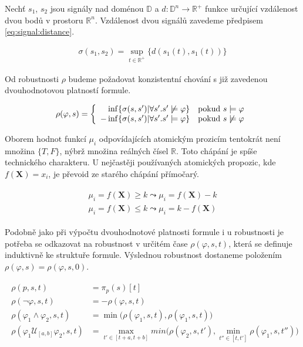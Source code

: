Nechť $s_1$, $s_2$ jsou signály nad doménou $\mathbb{D}$ a $d: \mathbb{D}^n \rightarrow \mathbb{R}^{+}$
funkce určující vzdálenost dvou bodů v prostoru $\mathbb{R}^n$. 
Vzdálenost dvou signálů zavedeme předpisem \ref{eq:signal:distance}.

\begin{align}\label{eq:signal:distance}
\sigma(s_1, s_2) = {\displaystyle \sup_{t \in \mathbb{R}^{+}}} \{d(s_1(t), s_1(t))\}
\end{align}

Od robustnosti $\rho$ budeme požadovat konzistentní chování s již zavedenou dvouhodnotovou platností
formule. 

\begin{align}\label{eq:signal:distance}
\rho(\varphi, s) = \left\{\begin{array}{r@{\quad}c}
\inf\{\sigma(s, s') | \forall s'. s' \not\models \varphi \}	& \textrm{pokud } s \models \varphi	\\
- \inf\{\sigma(s, s') | \forall s'. s' \models \varphi \}	& \textrm{pokud } s \not\models \varphi
\end{array} \right.
\end{align}

Oborem hodnot funkcí $\mu_i$ odpovídajících atomickým prozicím tentokrát není množina $\{T, F\}$,
nýbrž množina reálných čísel $\mathbb{R}$. Toto chápání je spíše technického charakteru. U nejčastěji používaných
atomických propozic, kde $f(\mathbf{X}) = x_i$, je převoid ze starého chápání přímočarý.

\begin{align}\label{eq:stl:semantics}
\begin{array}{ll}
\mu_i = f(\mathbf{X}) \geq k		\leadsto \mu_i = f(\mathbf{X}) - k							\\
\mu_i = f(\mathbf{X}) \leq k		\leadsto \mu_i = k - f(\mathbf{X})
\end{array}
\end{align}

Podobně jako při výpočtu dvouhodnotové platnosti formule i u robustnosti je potřeba se odkazovat
na robustnost v určitém čase $\rho(\varphi, s, t)$, která se definuje induktivně ke struktuře
formule. Výslednou robustnost dostaneme položením $\rho(\varphi, s) = \rho(\varphi, s, 0)$.

\begin{align}\label{eq:stl:semantics}
\begin{array}{ll}
\rho(p, s, t)											&= \pi_p(s)[t]											\\
\rho(\neg\varphi, s, t)									&= - \rho(\varphi, s, t)								\\
\rho(\varphi_1 \wedge \varphi_2, s, t)					&= \min\Big(\rho(\varphi_1, s, t), \rho(\varphi_1, s, t)\Big)	\\
\rho(\varphi_1 \mathcal{U}_{[a, b]} \varphi_2, s, t)	&= {\displaystyle \max_{t' \in [t + a, t + b]}} min\Big(\rho(\varphi_2, s, t'), {\displaystyle\min_{t'' \in [t, t']}}\rho(\varphi_1, s, t'')\Big)
\end{array}
\end{align}

